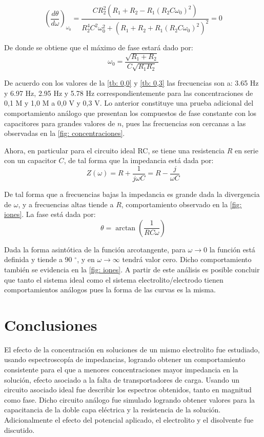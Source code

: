 \documentclass[fleqn,11pt]{SelfArx}
\begin{document}
	\footnotesize
	\begin{equation}
		\left(\dfrac{d\theta}{d\omega}\right)_{\omega_0} =  \dfrac{CR_2^2\left(R_1 + R_2 -R_1(R_2C\omega_0)^2\right)}{R_2^4C^2\omega_0^2 + \left(R_1 + R_2 + R_1(R_2C\omega_0)^2\right)^2} = 0
	\end{equation}
	\normalsize
	
	De donde se obtiene que el m\'aximo de fase estar\'a dado por:
	\begin{equation}
		\omega_0 = \dfrac{\sqrt{R_1 + R_2}}{C\sqrt{R_1R_2}}
	\end{equation}
	
	De acuerdo con los valores de la \autoref{tb: 0,0} y \autoref{tb: 0,3} las frecuencias son a: 3.65 Hz y 6.97 Hz, 2.95 Hz y 5.78 Hz correspondientemente para las concentraciones de 0,1 M y 1,0 M a 0,0 V y 0,3 V. Lo anterior constituye una prueba adicional del comportamiento an\'alogo que presentan los compuestos de fase constante con los capacitores para grandes valores de $n$, pues las frecuencias son cercanas a las observadas en la \autoref{fig: concentraciones}.
	\pagebreak
	
	Ahora, en particular para el circuito ideal RC, se tiene una resistencia $R$ en serie con un capacitor $C$, de tal forma que la impedancia est\'a dada por:
	\begin{equation}
		Z(\omega) = R + \dfrac{1}{j\omega C} = R - \dfrac{j}{\omega C}
	\end{equation}
	
	De tal forma que a frecuencias bajas la impedancia es grande dada la divergencia de $\omega$, y a frecuencias altas tiende a $R$, comportamiento observado en la \autoref{fig: iones}. La fase est\'a dada por:
	\begin{equation}
		\theta = \arctan\left(\dfrac{1}{RC\omega}\right)
	\end{equation}
	
	Dada la forma asint\'otica de la funci\'on arcotangente, para $\omega\rightarrow0$ la funci\'on est\'a definida y tiende a 90 $^\circ$, y en $\omega\rightarrow\infty$ tendr\'a valor cero. Dicho comportamiento tambi\'en se evidencia en la \autoref{fig: iones}. A partir de este an\'alisis es posible concluir que tanto el sistema ideal como el sistema electrolito/electrodo tienen comportamientos an\'alogos pues la forma de las curvas es la misma.
	
	\section{Conclusiones}
	El efecto de la concentraci\'on en soluciones de un mismo electrolito fue estudiado, usando espectroscop\'ia de impedancias, logrando obtener un comportamiento consistente para el que a menores concentraciones mayor impedancia en la soluci\'on, efecto asociado a la falta de transportadores de carga. Usando un circuito asociado ideal fue describir los espectros obtenidos, tanto en magnitud como fase. Dicho circuito an\'alogo fue simulado logrando obtener valores para la capacitancia de la doble capa el\'ectrica y la resistencia de la soluci\'on. Adicionalmente el efecto del potencial aplicado, el electrolito y el disolvente fue discutido.
	
	
	
	
	
\end{document}
